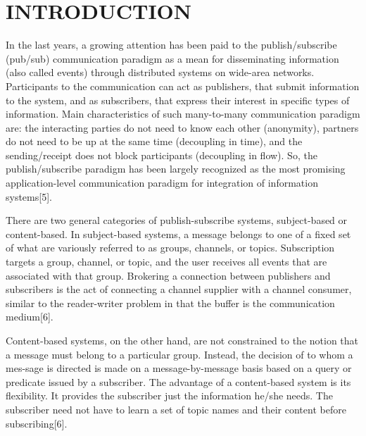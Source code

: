 \documentclass[MTech]{iitmdiss}
\begin{document}


\pagestyle{fancy}
\rhead{}
\rfoot{\thepage}
\cfoot{\*}
\renewcommand{\footrulewidth}{1pt}
\renewcommand{\headrulewidth}{1pt}
\setlength{\headsep}{0.5in}


\chapter{INTRODUCTION}
\label{chap:intro}
In the last years, a growing attention has been paid to the publish/subscribe
(pub/sub) communication paradigm as a mean for disseminating information (also called events) through distributed systems on wide-area networks.
Participants to the communication can act as publishers, that submit information to the system, and as subscribers, that express their interest in specific
types of information. Main characteristics of such many-to-many communication paradigm are: the interacting parties do not need to know each other
(anonymity), partners do not need to be up at the same time (decoupling
in time), and the sending/receipt does not block participants (decoupling in
flow). So, the publish/subscribe paradigm has been largely recognized as the
most promising application-level communication paradigm for integration of
information systems[5].


There are two general categories of publish-subscribe systems, subject-based or content-based. In subject-based systems, a message belongs to one of a fixed set of what are variously referred to as groups, channels, or topics. Subscription targets a group, channel,
or topic, and the user receives all events that are associated with that group. Brokering
a connection between publishers and subscribers is the act of connecting a channel supplier with a channel consumer, similar to the reader-writer problem in that the buffer is
the communication medium[6].

Content-based systems, on the other hand, are not constrained to the notion that a
message must belong to a particular group. Instead, the decision of to whom a mes-sage is directed is made on a message-by-message basis based on a query or predicate
issued by a subscriber. The advantage of a content-based system is its flexibility. It provides the subscriber just the information he/she needs. The subscriber need not have to
learn a set of topic names and their content before subscribing[6].
\end{document}
